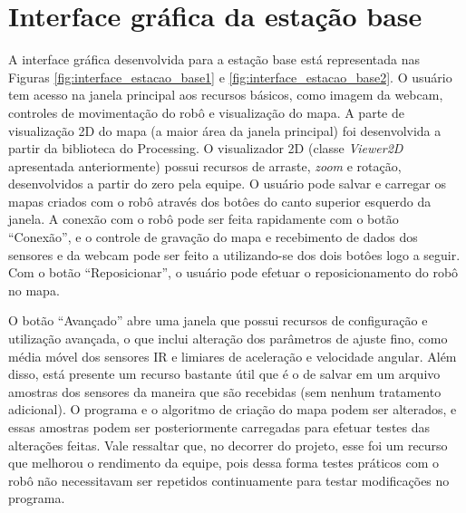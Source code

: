 \chapter{Interface gráfica da estação base}

A interface gráfica desenvolvida para a estação base está representada nas Figuras \ref{fig:interface_estacao_base1} e \ref{fig:interface_estacao_base2}. O usuário tem acesso na janela principal aos recursos básicos, como imagem da webcam, controles de movimentação do robô e visualização do mapa.
A parte de visualização 2D do mapa (a maior área da janela principal) foi desenvolvida a partir da biblioteca do Processing. O visualizador 2D (classe \textit{Viewer2D} apresentada anteriormente) possui recursos de arraste, \textit{zoom} e rotação, desenvolvidos a partir do zero pela equipe. O usuário pode salvar e carregar os mapas criados com o robô através dos botôes do canto superior esquerdo da janela. A conexão com o robô pode ser feita rapidamente com o botão ``Conexão'', e o controle de gravação do mapa e recebimento de dados dos sensores e da webcam pode ser feito a utilizando-se dos dois botôes logo a seguir. Com o botão ``Reposicionar'', o usuário pode efetuar o reposicionamento do robô no mapa. 

O botão ``Avançado'' abre uma janela que possui recursos de configuração e utilização avançada, o que inclui alteração dos parâmetros de ajuste fino, como média móvel dos sensores IR e limiares de aceleração e velocidade angular. Além disso, está presente um recurso bastante útil que é o de salvar em um arquivo amostras dos sensores da maneira que são recebidas (sem nenhum tratamento adicional). O programa e o algoritmo de criação do mapa podem ser alterados, e essas amostras podem ser posteriormente carregadas para efetuar testes das alterações feitas. Vale ressaltar que, no decorrer do projeto, esse foi um recurso que melhorou o rendimento da equipe, pois dessa forma testes práticos com o robô não necessitavam ser repetidos continuamente para testar modificações no programa.

